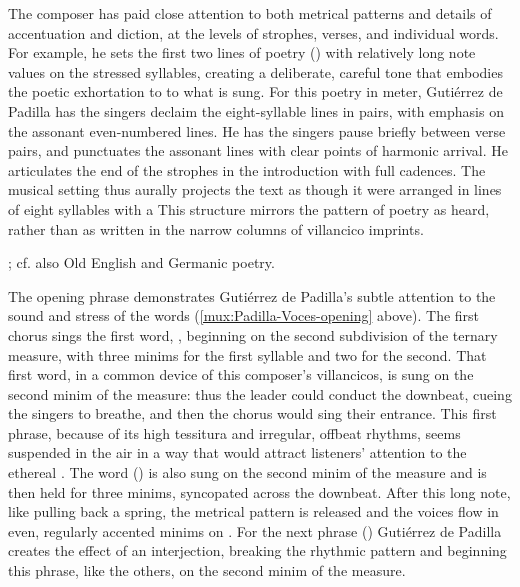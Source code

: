 The composer has paid close attention to both metrical patterns and details of
accentuation and diction, at the levels of strophes, verses, and individual
words.
For example, he sets the first two lines of poetry () with
relatively long note values on the stressed syllables, creating a deliberate,
careful tone that embodies the poetic exhortation to  to
what is sung.
For this poetry in  meter, Gutiérrez de Padilla has the singers
declaim the eight-syllable lines in pairs, with emphasis on the assonant
even-numbered lines.
He has the singers pause briefly between verse pairs, and punctuates the
assonant lines with clear points of harmonic arrival.
He articulates the end of the strophes in the introduction with full cadences.
The musical setting thus aurally projects the text as though it were arranged
in lines of eight syllables with a 
This structure mirrors the pattern of  poetry as heard, rather
than as written in the narrow columns of villancico imprints.%
\begin{Footnote}
    \Autocites
    {Navarro:Metrica}
    [this structure is used in the ][32--50]
    {MenendezPidal:Crestomatia}; 
    cf. also Old English and Germanic poetry.
\end{Footnote}

The opening phrase demonstrates Gutiérrez de Padilla's subtle attention to the
sound and stress of the words (\cref{mux:Padilla-Voces-opening} above).
The first chorus sings the first word, , beginning on the second
subdivision of the ternary measure, with three minims for the first syllable and
two for the second.
That first word, in a common device of this composer's villancicos, is sung on
the second minim of the measure: thus the leader could conduct the downbeat,
cueing the singers to breathe, and then the chorus would sing their entrance. 
This first phrase, because of its high tessitura and irregular, offbeat rhythms,
seems suspended in the air in a way that would attract listeners' attention to
the ethereal . 
The word  () is also sung on the second minim of the
measure and is then held for three minims, syncopated across the downbeat.
After this long note, like pulling back a spring, the metrical pattern is
released and the voices flow in even, regularly accented minims on .
For the next phrase () Gutiérrez de Padilla
creates the effect of an interjection, breaking the rhythmic pattern and
beginning this phrase, like the others, on the second minim of the measure.

